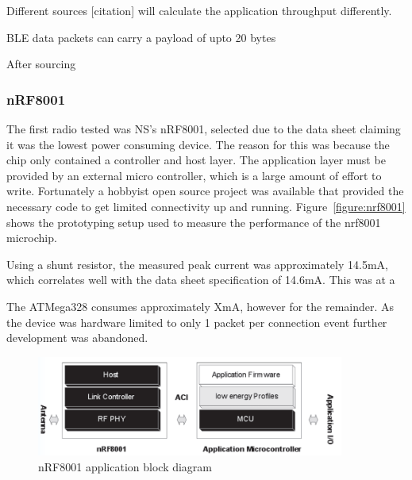 \documentclass[]{article}
\begin{document}
Different sources [citation] will calculate the application throughput differently. 

\ac{BLE} data packets can carry a payload of upto 20 bytes

After sourcing
\subsubsection{nRF8001}
The first radio tested was \ac{NS}'s nRF8001, selected due to the data sheet claiming it was the lowest power consuming device. The reason for this was because the chip only contained a controller and host layer. The application layer must be provided by an external micro controller, which is a large amount of effort to write. Fortunately a hobbyist open source project\cite{Guan2013} was available that provided the necessary code to get limited connectivity up and running. Figure~\ref{figure:nrf8001} shows the prototyping setup used to measure the performance of the nrf8001 microchip. \cite{nrf8001}

Using a shunt resistor, the measured peak current was approximately 14.5mA, which correlates well with the data sheet specification of 14.6mA. This was at a 

The ATMega328 consumes approximately XmA, however for the remainder. As the device was hardware limited to only 1 packet per connection event further development was abandoned.



\begin{figure}[htb]
	\begin{center}
		\includegraphics[width = 0.9\textwidth]{nrf8001stack}
	\end{center}
	\caption{nRF8001 application block diagram }
	\label{fig:nrf8001stack}
\end{figure}
\end{document}
